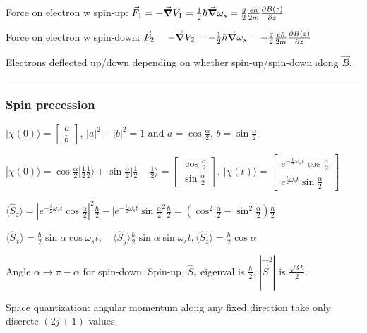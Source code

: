 Force on electron w spin-up: $\vec{F}_1 = -\vec{\grad} V_1 = \frac{1}{2} \hbar \vec{\grad} \omega_s = \frac{g}{2} \frac{e \hbar}{2m} \pdv{B(z)}{z}$

Force on electron w spin-down: $\vec{F}_2 = -\vec{\grad} V_2 = -\frac{1}{2} \hbar \vec{\grad} \omega_s = - \frac{g}{2} \frac{e \hbar}{2m} \pdv{B(z)}{z}$

Electrons deflected up/down depending on whether spin-up/spin-down along $\vec{B}$.

\hrule height 0.05pt

\subsubsection{Spin precession}

$| \chi(0) \rangle = \begin{bmatrix} a \\ b \end{bmatrix}$, $|a|^2 + |b|^2 = 1$ and $a = \cos \frac{\alpha}{2}$, $b = \sin \frac{\alpha}{2}$

$|\chi (0) \rangle = \cos \frac{\alpha}{2} | \frac{1}{2} \frac{1}{2} \rangle + \sin \frac{\alpha}{2} | \frac{1}{2} -\frac{1}{2} \rangle = \begin{bmatrix} \cos \frac{\alpha}{2} \\ \sin \frac{\alpha}{2} \end{bmatrix}$, 
\tiny
$|\chi(t) \rangle = \begin{bmatrix} e^{-\frac{i}{2} \omega_s t} \cos \frac{\alpha}{2} \\ e^{\frac{i}{2} \omega_s t} \sin \frac{\alpha}{2} \end{bmatrix}$
\scriptsize

$\langle \widehat{S}_z \rangle = | e^{-\frac{i}{2} \omega_s t} \cos \frac{\alpha}{2}|^2 \frac{\hbar}{2} - |e^{-\frac{i}{2} \omega_s t} \sin \frac{\alpha}{2}^2 \frac{\hbar}{2} = (\cos^2 \frac{\alpha}{2} - \sin^2 \frac{\alpha}{2}) \frac{\hbar}{2}$

$\langle \widehat{S}_x \rangle = \frac{\hbar}{2} \sin \alpha \cos \omega_s t, \quad \langle \widehat{S}_y \rangle \frac{\hbar}{2} \sin \alpha \sin \omega_s t, \langle \widehat{S}_z \rangle = \frac{\hbar}{2} \cos \alpha$

Angle $\alpha \rightarrow \pi - \alpha$ for spin-down. Spin-up, $\widehat{S}_z$ eigenval is $\frac{\hbar}{2}$, $|\widehat{\vec{S}}^2|$ is $\frac{\sqrt{3} \hbar}{2}$.

Space quantization: angular momentum along any fixed direction take only discrete $(2j+1)$ values.

